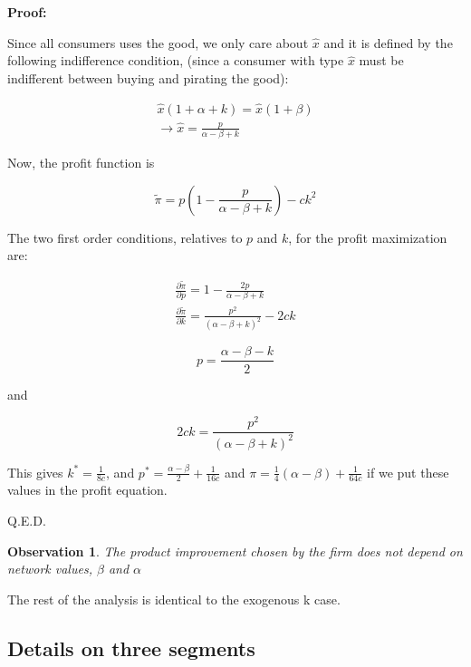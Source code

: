 \documentclass[11pt]{article}
\newtheorem{observation}{Observation}
\begin{document}
\textbf{Proof:}

\label{endk1}

Since all consumers uses the good, we only care about $\hat{x}$ and it is defined by the following indifference condition, (since a consumer with type $\hat{x}$ must be indifferent between buying and pirating the good):

\begin{align*}
\hat{x}(1+\alpha+k)=\hat{x}(1+\beta) \\
\rightarrow \hat{x} = \frac{p}{\alpha - \beta +k}
\end{align*}


Now, the profit function is

\begin{equation*}
\tilde{\pi} = p\left(1-\frac{p}{\alpha - \beta +k}\right)-c k^2
\end{equation*}

The two first order conditions, relatives to $p$ and $k$, for the profit maximization are:

\begin{align*}
\frac{\partial \tilde{\pi}}{\partial p}= 1-\frac{2p}{\alpha - \beta +k}\\
\frac{\partial \tilde{\pi}}{\partial k}=  \frac{p^2}{(\alpha-\beta+k)^2}-2ck 
\end{align*} 

\begin{equation*}
p = \frac{\alpha-\beta-k}{2}
\end{equation*}

and 

\begin{equation*}
2ck = \frac{p^2}{(\alpha-\beta+k)^2}
\end{equation*}

This gives $k^*=\frac{1}{8c}$,  and $p^*=\frac{\alpha-\beta}{2}+\frac{1}{16c}$ and $\pi=\frac{1}{4}(\alpha-\beta)+\frac{1}{64c} $ if we put these values in the profit equation. 

Q.E.D.

\begin{observation}
The product improvement chosen by the firm does not depend on network values, $\beta$ and $\alpha$
\end{observation}

The rest of the analysis is identical to the exogenous k case. 

\subsection{Details on three segments}
\end{document}
